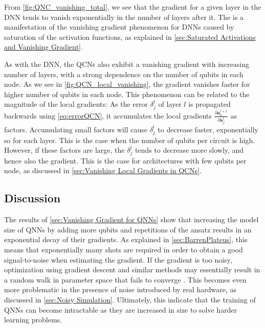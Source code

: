 From \cref{fig:QNC_vanishing_total}, we see that the gradient for a given layer in the DNN tends to vanish exponentially in the number of layers after it. The is a manifestation of the vanishing gradient phenomenon for DNNs caused by saturation of the activation functions, as explained in \cref{sec:Saturated Activations and Vanishing Gradient}.

As with the DNN, the QCNs also exhibit a vanishing  gradient with increasing number of layers, with a strong dependence on the number of qubits in each node. As we see in \cref{fig:QCN_local_vanishing}, the gradient vanishes faster for higher number of qubits in each node. This phenomenon can be related to the magnitude of the local gradients: As the error $\delta^l_j$ of layer $l$ is propagated backwards using \cref{eq:errorQCN}, it accumulates the local gradients $\frac{\partial \boldsymbol{a}^{l+1}_k}{\partial \boldsymbol{a}^{l}_j}$ as factors. Accumulating small factors will cause $\delta^l_j$ to decrease faster, exponentially so for each layer. This is the case when the number of qubits per circuit is high. However, if these factors are large, the $\delta^l_j$ tends to decrease more slowly, and hence also the gradient. This is the case for architectures with few qubits per node, as discussed in \cref{sec:Vanishing Local Gradients in QCNs}.

\subsection{Discussion}\label{sec:Vanishing Gradient Phenomenon Discussion}
The results of \cref{sec:Vanishing Gradient for QNNs} show that increasing the model size of QNNs by adding more qubits and repetitions of the ansatz results in an exponential decay of their gradients. As explained in \cref{sec:BarrenPlateus}, this means that exponentially many shots are required in order to obtain a good signal-to-noise when estimating the gradient. If the gradient is too noisy, optimization using gradient descent and similar methods may essentially result in a random walk in parameter space that fails to converge \cite{skolik2020layerwise}. This becomes even more problematic in the presence of noise introduced by real hardware, as discussed in \cref{sec:Noisy Simulation}. Ultimately, this indicate that the training of QNNs can become intractable as they are increased in size to solve harder learning problems.    

